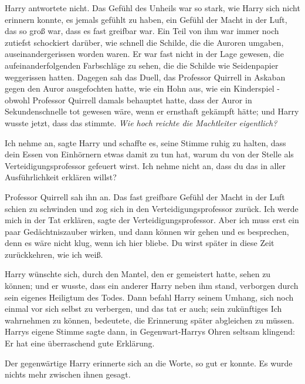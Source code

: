 Harry antwortete nicht. Das Gefühl des Unheils war so stark, wie Harry sich
nicht erinnern konnte, es jemals gefühlt zu haben, ein Gefühl der Macht
in der Luft, das so groß war, dass es fast greifbar war. Ein Teil von ihm
war immer noch zutiefst schockiert darüber, wie schnell die Schilde, die
die Auroren umgaben, auseinandergerissen worden waren. Er war fast nicht
in der Lage gewesen, die aufeinanderfolgenden Farbschläge zu sehen, die
die Schilde wie Seidenpapier weggerissen hatten. Dagegen sah das Duell,
das Professor Quirrell in Askaban gegen den Auror ausgefochten hatte, wie
ein Hohn aus, wie ein Kinderspiel - obwohl Professor Quirrell damals
behauptet hatte, dass der Auror in Sekundenschnelle tot gewesen wäre,
wenn er ernsthaft gekämpft hätte; und Harry wusste jetzt, dass das
stimmte.
\emph{Wie hoch reichte die Machtleiter eigentlich?}

\glqq Ich nehme an\grqq{}, sagte Harry und schaffte es, seine Stimme ruhig zu
halten, \glqq dass dein Essen von Einhörnern etwas damit zu tun hat,
warum du von der Stelle als Verteidigungsprofessor gefeuert wirst. Ich
nehme nicht an, dass du das in aller Ausführlichkeit erklären
willst?\grqq{}

Professor Quirrell sah ihn an. Das fast greifbare Gefühl der Macht in der Luft
schien zu schwinden und zog sich in den Verteidigungsprofessor zurück.
\glqq Ich werde mich in der Tat erklären\grqq{}, sagte der
Verteidigungsprofessor. \glqq Aber ich muss erst ein paar
Gedächtniszauber wirken, und dann können wir gehen und es besprechen,
denn es wäre nicht klug, wenn ich hier bliebe. Du wirst später in diese
Zeit zurückkehren, wie ich weiß.\grqq{}

Harry wünschte sich, durch den Mantel, den er gemeistert hatte, sehen zu können;
und er wusste, dass ein anderer Harry neben ihm stand, verborgen durch
sein eigenes Heiligtum des Todes. Dann befahl Harry seinem Umhang, sich
noch einmal vor sich selbst zu verbergen, und das tat er auch; sein
zukünftiges Ich wahrnehmen zu können, bedeutete, die Erinnerung später
abgleichen zu müssen. Harrys eigene Stimme sagte dann, in
Gegenwart-Harrys Ohren seltsam klingend: \glqq Er hat eine überraschend
gute Erklärung.\grqq{}

Der gegenwärtige Harry erinnerte sich an die Worte, so gut er konnte. Es wurde
nichts mehr zwischen ihnen gesagt.

